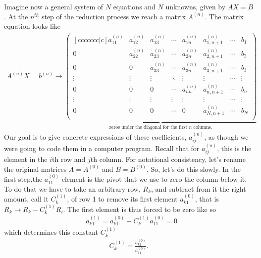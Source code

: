 Imagine now a general system of $N$ equations and $N$ unknowns, given by $AX=B$. At the $n^{th}$ step of the reduction process we reach a matrix $A^{(n)}$. The matrix equation looks like
\begin{align*}
A^{(n)}X = b^{(n)} \to 
\underbrace{
\begin{pmatrix}[ccccccc|c]
a^{(n)}_{11} & a^{(n)}_{12} & a^{(n)}_{13} & \cdots & a^{(n)}_{1n} & a^{(n)}_{1,n+1} & \cdots & b_1    \\
0            & a^{(n)}_{22} & a^{(n)}_{23} & \cdots & a^{(n)}_{2n} & a^{(n)}_{2,n+1} & \cdots & b_2    \\
0            & 0            & a^{(n)}_{33} & \cdots & a^{(n)}_{3n} & a^{(n)}_{3,n+1} & \cdots & b_3    \\
\vdots       & \vdots       & \vdots       & \ddots & \vdots       & \vdots          & \cdots & \vdots \\
0            & 0            & 0            & \cdots & a^{(n)}_{nn} & a^{(n)}_{n,n+1} & \cdots & b_n    \\
\vdots       & \vdots       & \vdots       & \vdots & \vdots       & \vdots          & \cdots & \vdots \\
0            & 0            & 0            & \cdots & 0            & a^{(n)}_{N,n+1} & \cdots & b_N    \\
\end{pmatrix}
}_\text{zeros under the diagonal for the first $n$ columns.}
\end{align*}
Our goal is to give concrete expressions of these coefficients, $a^{(n)}_{ij}$, as though we were going to code them in a computer program. Recall that for $a^{(n)}_{ij}$, this is the element in the $i$th row and $j$th column. For notational consistency, let's rename the original matrices $A=A^{(0)}$ and $B=B^{(0)}$. So, let's do this slowly. In the first step,the $a^{(0)}_{11}$ element is the pivot that we use to zero the column below it. To do that we have to take an arbitrary row, $R_k$, and subtract from it the right amount, call it $C^{(1)}_k$, of row 1 to remove its first element $a^{(0)}_{k1}$, that is $R_k \to R_k - C^{(1)}_k R_i$. The first element is thus forced to be zero like so
\begin{align*}
& a^{(1)}_{k1} = a^{(0)}_{k1} - C^{(1)}_k a^{(0)}_{11} = 0
\end{align*}
which determines this constant $C^{(1)}_k$
\begin{align*}
C^{(1)}_k = \frac{a^{(0)}_{k1}}{a^{(0)}_{11}}.
\end{align*}
